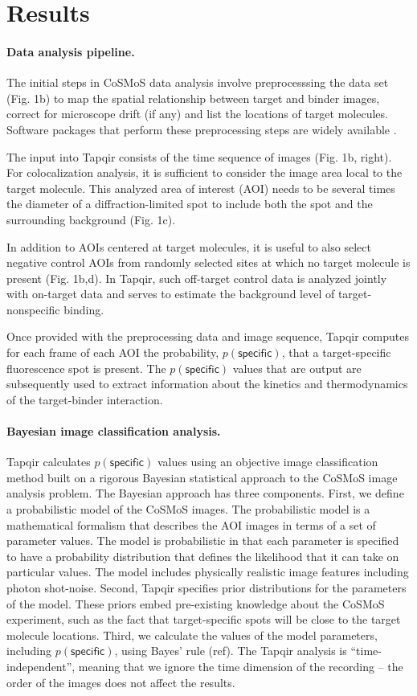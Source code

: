 \section*{Results}
\paragraph{Data analysis pipeline.} %
The initial steps in CoSMoS data analysis involve preprocesssing the data set (Fig. 1b) to map the spatial relationship between target and binder images, correct for microscope drift (if any) and list the locations of target molecules. Software packages that perform these preprocessing steps are widely available \cite{Friedman2015-nx, Smith2019-yb}.

The input into Tapqir consists of the time sequence of images (Fig. 1b, right). For colocalization analysis, it is sufficient to consider the image area local to the target molecule. This analyzed area of interest (AOI) needs to be several times the diameter of a diffraction-limited spot to include both the spot and the surrounding background (Fig. 1c). 

In addition to AOIs centered at target molecules, it is useful to also select negative control AOIs from randomly selected sites at which no target molecule is present (Fig. 1b,d). In Tapqir, such off-target control data is analyzed jointly with on-target data and serves to estimate the background level of target-nonspecific binding. 

Once provided with the preprocessing data and image sequence, Tapqir computes for each frame of each AOI the  probability, $p(\mathsf{specific})$, that a target-specific fluorescence spot is present.   The $p(\mathsf{specific})$ values that are output are subsequently used to extract information about the kinetics and thermodynamics of the target-binder interaction.

\paragraph{Bayesian image classification analysis.}
Tapqir calculates $p(\mathsf{specific})$ values using an objective image classification method built on a rigorous Bayesian statistical approach to the CoSMoS image analysis problem. The Bayesian approach has three components. First, we define a probabilistic model of the CoSMoS images. The probabilistic model is a mathematical formalism that describes the AOI images in terms of a set of parameter values.  The model is probabilistic in that each parameter is specified to have a probability distribution that defines the likelihood that it can take on particular values. The model includes physically realistic image features including photon shot-noise. Second, Tapqir specifies prior distributions for the parameters of the model. These priors embed pre-existing knowledge about the CoSMoS experiment, such as the fact that target-specific spots will be close to the target molecule locations. Third, we calculate the values of the model parameters, including $p(\mathsf{specific})$, using Bayes' rule (ref). The Tapqir analysis is “time-independent”, meaning that we ignore the time dimension of the recording -- the order of the images does not affect the results.

